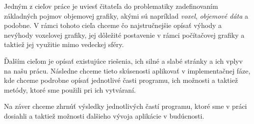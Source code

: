 Jedným z cieľov práce je uviesť čitateľa do problematiky zadefinovaním základných pojmov objemovej grafiky, akými sú napríklad \textit{voxel}, \textit{objemové dáta} a podobne. V rámci tohoto cieľa chceme čo najstručnejšie opísať výhody a nevýhody voxelovej grafiky, jej dôležité postavenie v rámci počítačovej grafiky a taktiež jej využitie mimo vedeckej sféry.

Ďalším cieľom je opísať existujúce riešenia, ich silné a slabé stránky a ich vplyv na našu prácu. Následne chceme tieto skúsenosti aplikovať v implementačnej fáze, kde chceme podrobne opísať jednotlivé časti programu, ich možnosti a taktiež metódy, ktoré sme použili pri ich vytváraní. 

Na záver chceme zhrnúť výsledky jednotlivých častí programu, ktoré sme v práci dosiahli a taktiež možnosti ďalšieho vývoja aplikácie v budúcnosti.

